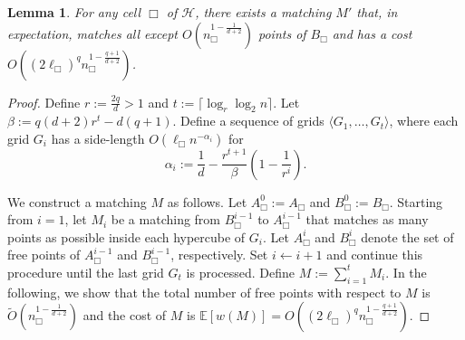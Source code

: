 \documentclass[11pt,onecolumn]{article}
\def\mcH{{\mathcal{H}}}
\def\mbE{{\mathbb{E}}}
\newcommand{\cell}{\Box}
\newtheorem{lemma}{Lemma}[section]
\begin{document}
\begin{lemma}\label{lemma:GRS-matching-d}
    For any cell $\cell$ of $\mcH$, there exists a matching $M'$ that, in expectation, matches all except $O(n_\cell^{1-\frac{1}{d+2}})$ points of $B_\cell$ and has a cost $O((2\ell_\cell)^q n_\cell^{1-\frac{q+1}{d+2}})$.
\end{lemma}
\begin{proof}
Define $r:= \frac{2q}{d}>1$ and $t:=\lceil \log_r \log_2 n\rceil$. Let $\beta:=q(d+2)r^t - d(q+1)$. Define a sequence of grids $\langle G_1, \ldots, G_t\rangle$, where each grid $G_i$ has a side-length $O(\ell_\cell n^{-\alpha_i})$ for \[\alpha_i:=\frac{1}{d} - \frac{r^{t+1}}{\beta}\left(1-\frac{1}{r^i}\right).\]

We construct a matching $M$ as follows.
Let $A_\cell^0:=A_\cell$ and $B_\cell^0:=B_\cell$. Starting from $i=1$, let $M_i$ be a matching from $B_\cell^{i-1}$ to $A_\cell^{i-1}$ that matches as many points as possible inside each hypercube of $G_i$. Let $A_\cell^i$ and $B_\cell^i$ denote the set of free points of $A_\cell^{i-1}$ and $B_\cell^{i-1}$, respectively. Set $i\leftarrow i+1$ and continue this procedure until the last grid $G_t$ is processed. Define $M:=\sum_{i=1}^t M_i$. 
In the following, we show that the total number of free points with respect to $M$ is $\tilde{O}(n_\cell^{1-\frac{1}{d+2}})$ and the cost of $M$ is $\mbE[w(M)]=O((2\ell_\cell)^qn_\cell^{1-\frac{q+1}{d+2}})$.


\end{proof}
\end{document}
